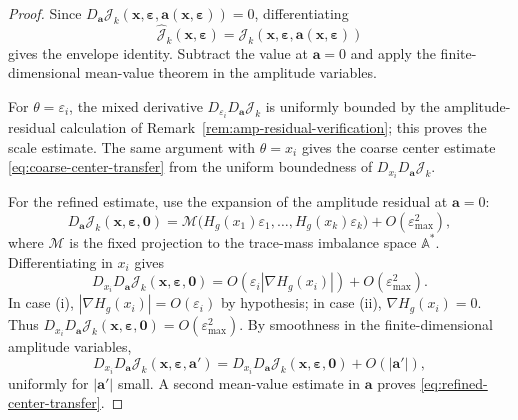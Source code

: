 \documentclass[11pt,reqno,a4paper]{amsart}
\numberwithin{equation}{section}
\theoremstyle{plain}
\theoremstyle{remark}
\theoremstyle{plain}
\begin{document}
\begin{proof}
Since
$D_{\mathbf a}\mathcal J_k(\mathbf x,\boldsymbol\varepsilon,
\mathbf a(\mathbf x,\boldsymbol\varepsilon))=0$, differentiating
\[
\hat{\mathcal J}_k(\mathbf x,\boldsymbol\varepsilon)
=\mathcal J_k(\mathbf x,\boldsymbol\varepsilon,
\mathbf a(\mathbf x,\boldsymbol\varepsilon))
\]
gives the envelope identity.  Subtract the value at $\mathbf a=0$ and apply the
finite-dimensional mean-value theorem in the amplitude variables.

For $\theta=\varepsilon_i$, the mixed derivative
$D_{\varepsilon_i}D_{\mathbf a}\mathcal J_k$ is uniformly bounded by the amplitude-residual
calculation of Remark~\ref{rem:amp-residual-verification}; this proves the scale estimate.
The same argument with $\theta=x_i$ gives the coarse center estimate
\eqref{eq:coarse-center-transfer} from the uniform boundedness of
$D_{x_i}D_{\mathbf a}\mathcal J_k$.

For the refined estimate, use the expansion of the amplitude residual at
$\mathbf a=0$:
\[
D_{\mathbf a}\mathcal J_k(\mathbf x,\boldsymbol\varepsilon,\mathbf 0)
=
\mathcal M\big(H_g(x_1)\varepsilon_1,\dots,H_g(x_k)\varepsilon_k\big)
+O(\varepsilon_{\max}^2),
\]
where $\mathcal M$ is the fixed projection to the trace-mass imbalance space
$\mathbb A^*$.  Differentiating in $x_i$ gives
\[
D_{x_i}D_{\mathbf a}\mathcal J_k(\mathbf x,\boldsymbol\varepsilon,\mathbf 0)
=O(\varepsilon_i|\nabla H_g(x_i)|)+O(\varepsilon_{\max}^2).
\]
In case \textup{(i)}, $|\nabla H_g(x_i)|=O(\varepsilon_i)$ by hypothesis; in case \textup{(ii)},
$\nabla H_g(x_i)=0$.  Thus
$D_{x_i}D_{\mathbf a}\mathcal J_k(\mathbf x,\boldsymbol\varepsilon,\mathbf 0)=O(\varepsilon_{\max}^2)$.
By smoothness in the finite-dimensional amplitude variables,
\[
D_{x_i}D_{\mathbf a}\mathcal J_k(\mathbf x,\boldsymbol\varepsilon,\mathbf a')
=D_{x_i}D_{\mathbf a}\mathcal J_k(\mathbf x,\boldsymbol\varepsilon,\mathbf 0)
+O(|\mathbf a'|),
\]
uniformly for $|\mathbf a'|$ small.  A second mean-value estimate in $\mathbf a$ proves
\eqref{eq:refined-center-transfer}.
\end{proof}
\end{document}

